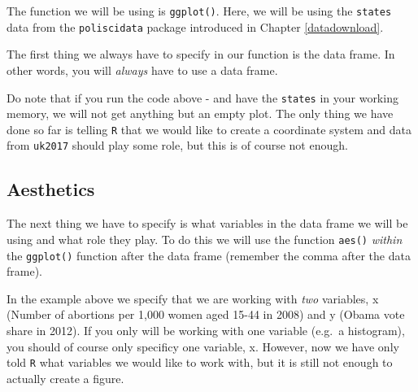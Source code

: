 \documentclass[12pt,oneside]{reedthesis}
\theoremstyle{definition}
\theoremstyle{definition}
\theoremstyle{definition}
\theoremstyle{remark}
\begin{document}
  The function we will be using is \texttt{ggplot()}. Here, we will be
  using the \texttt{states} data from the \texttt{poliscidata} package
  introduced in Chapter \ref{datadownload}.
  \begin{Shaded}
  \begin{Highlighting}[]
  \NormalTok{(}\NormalTok{)}
  \StringTok{ }
  \end{Highlighting}
  \end{Shaded}
  The first thing we always have to specify in our function is the data
  frame. In other words, you will \emph{always} have to use a data frame.
  \begin{Shaded}
  \begin{Highlighting}[]
  \end{Highlighting}
  \end{Shaded}
  Do note that if you run the code above - and have the \texttt{states} in
  your working memory, we will not get anything but an empty plot. The
  only thing we have done so far is telling \texttt{R} that we would like
  to create a coordinate system and data from \texttt{uk2017} should play
  some role, but this is of course not enough.
  
  \subsection{Aesthetics}\label{aesthetics}
  
  The next thing we have to specify is what variables in the data frame we
  will be using and what role they play. To do this we will use the
  function \texttt{aes()} \emph{within} the \texttt{ggplot()} function
  after the data frame (remember the comma after the data frame).
  \begin{Shaded}
  \begin{Highlighting}[]
  \NormalTok{(}
  \end{Highlighting}
  \end{Shaded}
  In the example above we specify that we are working with \emph{two}
  variables, x (Number of abortions per 1,000 women aged 15-44 in 2008)
  and y (Obama vote share in 2012). If you only will be working with one
  variable (e.g.~a histogram), you should of course only specificy one
  variable, x. However, now we have only told \texttt{R} what variables we
  would like to work with, but it is still not enough to actually create a
  figure.
  
\end{document}
